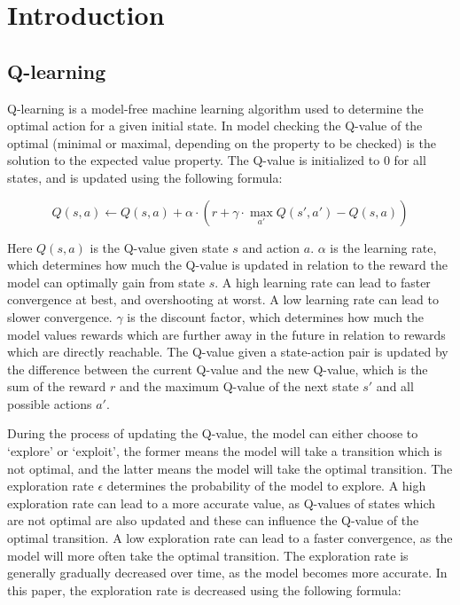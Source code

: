 \section{Introduction}

\subsection{Q-learning}

Q-learning is a model-free machine learning algorithm used to determine the optimal action for a given initial state. In model checking the Q-value of the optimal (minimal or maximal, depending on the property to be checked) is the solution to the expected value property. The Q-value is initialized to $0$ for all states, and is updated using the following formula:

\begin{equation}
    Q(s, a) \leftarrow Q(s, a) + \alpha \cdot (r + \gamma \cdot \max_{a'} Q(s', a') - Q(s, a))
\end{equation}

Here $Q(s, a)$ is the Q-value given state $s$ and action $a$. $\alpha$ is the learning rate, which determines how much the Q-value is updated in relation to the reward the model can optimally gain from state $s$. A high learning rate can lead to faster convergence at best, and overshooting at worst. A low learning rate can lead to slower convergence. $\gamma$ is the discount factor, which determines how much the model values rewards which are further away in the future in relation to rewards which are directly reachable. The Q-value given a state-action pair is updated by the difference between the current Q-value and the new Q-value, which is the sum of the reward $r$ and the maximum Q-value of the next state $s'$ and all possible actions $a'$.

During the process of updating the Q-value, the model can either choose to `explore' or `exploit', the former means the model will take a transition which is not optimal, and the latter means the model will take the optimal transition. The exploration rate $\epsilon$ determines the probability of the model to explore. A high exploration rate can lead to a more accurate value, as Q-values of states which are not optimal are also updated and these can influence the Q-value of the optimal transition. A low exploration rate can lead to a faster convergence, as the model will more often take the optimal transition. The exploration rate is generally gradually decreased over time, as the model becomes more accurate. In this paper, the exploration rate is decreased using the following formula:

